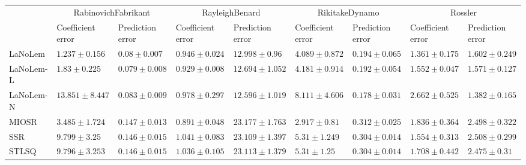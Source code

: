\begin{table*}
{\begin{tabular}{lllllllll}
 & \multicolumn{2}{c}{RabinovichFabrikant} & \multicolumn{2}{c}{RayleighBenard} & \multicolumn{2}{c}{RikitakeDynamo} & \multicolumn{2}{c}{Rossler} \\
 & Coefficient error & Prediction error & Coefficient error & Prediction error & Coefficient error & Prediction error & Coefficient error & Prediction error \\
\midrule
LaNoLem & $\mathbf{1.237}\pm 0.156$ & $0.08\pm 0.007$ & $0.946\pm 0.024$ & $12.998\pm 0.96$ & $4.089\pm 0.872$ & $0.194\pm 0.065$ & $\mathbf{1.361}\pm 0.175$ & $1.602\pm 0.249$ \\
LaNoLem-L & $1.83\pm 0.225$ & $\mathbf{0.079}\pm 0.008$ & $0.929\pm 0.008$ & $12.694\pm 1.052$ & $4.181\pm 0.914$ & $0.192\pm 0.054$ & $1.552\pm 0.047$ & $1.571\pm 0.127$ \\
LaNoLem-N & $13.851\pm 8.447$ & $0.083\pm 0.009$ & $0.978\pm 0.297$ & $\mathbf{12.596}\pm 1.019$ & $8.111\pm 4.606$ & $\mathbf{0.178}\pm 0.031$ & $2.662\pm 0.525$ & $\mathbf{1.382}\pm 0.165$ \\
MIOSR & $3.485\pm 1.724$ & $0.147\pm 0.013$ & $\mathbf{0.891}\pm 0.048$ & $23.177\pm 1.763$ & $\mathbf{2.917}\pm 0.81$ & $0.312\pm 0.025$ & $1.836\pm 0.364$ & $2.498\pm 0.322$ \\
SSR & $9.799\pm 3.25$ & $0.146\pm 0.015$ & $1.041\pm 0.083$ & $23.109\pm 1.397$ & $5.31\pm 1.249$ & $0.304\pm 0.014$ & $1.554\pm 0.313$ & $2.508\pm 0.299$ \\
STLSQ & $9.796\pm 3.253$ & $0.146\pm 0.015$ & $1.036\pm 0.105$ & $23.113\pm 1.379$ & $5.31\pm 1.25$ & $0.304\pm 0.014$ & $1.708\pm 0.442$ & $2.475\pm 0.31$ \\

\midrule


\end{tabular}}
\end{table*}
